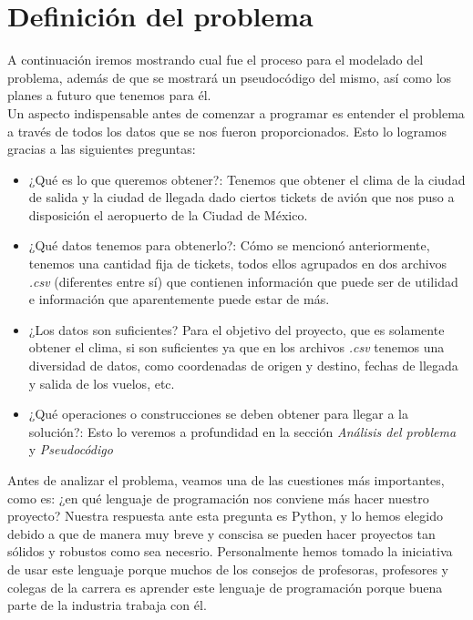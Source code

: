 \documentclass[letterpaper]{article}
\begin{document}
\section{Definición del problema}
A continuación iremos mostrando cual fue el proceso para el modelado del problema, además de que se mostrará un pseudocódigo del mismo, así como los planes a futuro que tenemos para él.\\
Un aspecto indispensable antes de comenzar a programar es entender el problema a través de todos los datos que se nos fueron proporcionados. Esto lo logramos gracias a las siguientes preguntas:
\begin{itemize}
	\item ¿Qué es lo que queremos obtener?: Tenemos que obtener el clima de la ciudad de salida y la ciudad de llegada dado ciertos tickets de avión que nos puso a disposición el aeropuerto de la Ciudad de México.
	\item  ¿Qué datos tenemos para obtenerlo?: Cómo se mencionó anteriormente, tenemos una cantidad fija de tickets, todos ellos agrupados en dos archivos \textit{.csv} (diferentes entre sí) que contienen información que puede ser de utilidad e información que aparentemente puede estar de más.
	\item ¿Los datos son suficientes? Para el objetivo del proyecto, que es solamente obtener el clima, si son suficientes ya que en los archivos \textit{.csv} tenemos una diversidad de datos, como coordenadas de origen y destino, fechas de llegada y salida de los vuelos, etc.
	\item ¿Qué operaciones o construcciones se deben obtener para llegar a la solución?: Esto lo veremos a profundidad en la sección \textit{Análisis del problema} y \textit{Pseudocódigo}
\end{itemize}
Antes de analizar el problema, veamos una de las cuestiones más importantes, como es: ¿en qué lenguaje de programación nos conviene más hacer nuestro proyecto? Nuestra respuesta ante esta pregunta es Python, y lo hemos elegido debido a que de manera muy breve y conscisa se pueden hacer proyectos tan sólidos y robustos como sea necesrio. Personalmente hemos tomado la iniciativa de usar este lenguaje porque muchos de los consejos de profesoras, profesores y colegas de la carrera es aprender este lenguaje de programación porque buena parte de la industria trabaja con él.
\end{document}
